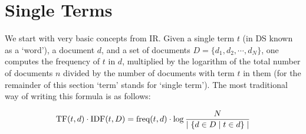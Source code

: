 




\section{Single Terms}

We start with very basic concepts from IR.  Given a  single term $t$ (in DS known as a `word'),  a document $d$, and a set of documents $D = \{d_1, d_2, \cdots, d_N\}$,  one computes  the frequency  of   $t$  in $d$, multiplied by  the logarithm of the  total number of documents $n$ divided by the number of documents with  term $t$ in them (for the remainder of this section `term' stands for `single term'). The most traditional way of writing this formula is as  follows:

\begin{equation}
\label{tf-idf}
\textmd{TF}(t,d) \cdot \textmd{IDF}(t, D) = \textmd{freq}(t, d) \cdot \log{{N} \over {\mid \{d \in D \mid t \in d\}\mid}}
\end{equation}

